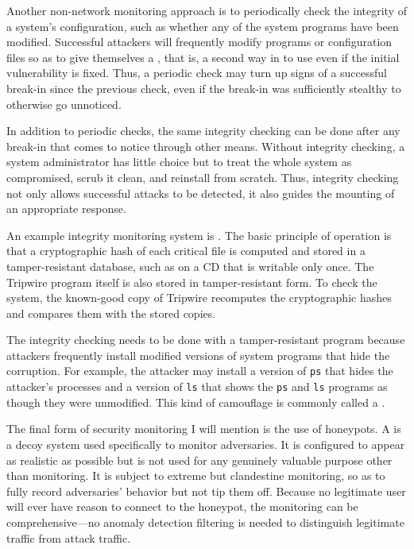 Another non-network monitoring approach is to periodically check the
integrity of a system's configuration, such as whether any of the
system programs have been modified.  Successful attackers will
frequently modify programs or configuration files so as to give
themselves a , that is, a second way in to use even
if the initial vulnerability is fixed.  Thus, a periodic check may
turn up signs of a successful break-in since the previous check,
even if the break-in was sufficiently stealthy to otherwise go unnoticed.

In addition to periodic checks, the same integrity checking can be
done after any break-in that comes to notice through other means.
Without integrity checking, a system administrator has little choice
but to treat the whole system as compromised, scrub it clean, and
reinstall from scratch.  Thus, integrity checking not only allows
successful attacks to be detected, it also guides the mounting of an
appropriate response.

An example integrity monitoring system is .  The basic
principle of operation is that a cryptographic hash of each critical
file is computed and stored in a tamper-resistant database, such as on
a CD that is writable only once.  The Tripwire program itself is also
stored in tamper-resistant form.  To check the system, the known-good
copy of Tripwire recomputes the cryptographic hashes and compares them
with the stored copies.

The integrity checking needs to be done with a tamper-resistant program
because
attackers frequently install modified versions of system programs
that hide the corruption.  For example, the attacker may install a version
of \verb|ps| that hides the attacker's processes and a version of \verb|ls|
that shows the \verb|ps| and \verb|ls| programs as though they were unmodified.
This kind of camouflage is commonly called a .

The final form of security monitoring I will mention is the use of
honeypots.  A  is a decoy system used specifically to
monitor adversaries.  It is configured to appear as realistic as
possible but is not used for any genuinely valuable purpose other than
monitoring.  It is subject to extreme but clandestine monitoring, so
as to fully record adversaries' behavior but not tip them off.
Because no legitimate user will ever have reason to connect to the
honeypot, the monitoring can be comprehensive---no anomaly detection
filtering is needed to distinguish legitimate traffic from attack
traffic.

